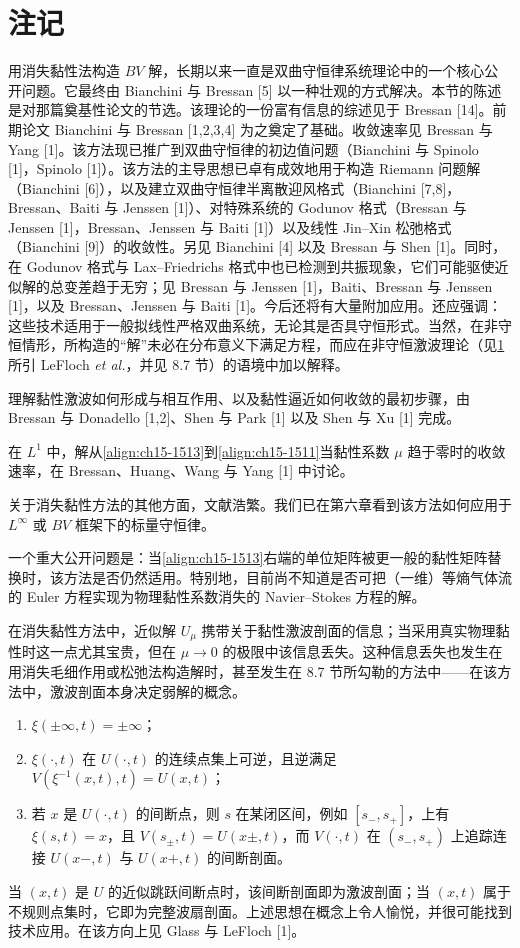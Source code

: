 \documentclass[../../main.tex]{subfiles}
\begin{document}
\section{注记}\label{section:ch15-注记}

用消失黏性法构造 $BV$ 解，长期以来一直是双曲守恒律系统理论中的一个核心公开问题。它最终由 Bianchini 与 Bressan [5] 以一种壮观的方式解决。本节的陈述是对那篇奠基性论文的节选。该理论的一份富有信息的综述见于 Bressan [14]。前期论文 Bianchini 与 Bressan [1,2,3,4] 为之奠定了基础。收敛速率见 Bressan 与 Yang [1]。该方法现已推广到双曲守恒律的初边值问题（Bianchini 与 Spinolo [1]，Spinolo [1]）。该方法的主导思想已卓有成效地用于构造 Riemann 问题解（Bianchini [6]），以及建立双曲守恒律半离散迎风格式（Bianchini [7,8]，Bressan、Baiti 与 Jenssen [1]）、对特殊系统的 Godunov 格式（Bressan 与 Jenssen [1]，Bressan、Jenssen 与 Baiti [1]）以及线性 Jin--Xin 松弛格式（Bianchini [9]）的收敛性。另见 Bianchini [4] 以及 Bressan 与 Shen [1]。同时，在 Godunov 格式与 Lax--Friedrichs 格式中也已检测到共振现象，它们可能驱使近似解的总变差趋于无穷；见 Bressan 与 Jenssen [1]，Baiti、Bressan 与 Jenssen [1]，以及 Bressan、Jenssen 与 Baiti [1]。今后还将有大量附加应用。还应强调：这些技术适用于一般拟线性严格双曲系统，无论其是否具守恒形式。当然，在非守恒情形，所构造的“解”未必在分布意义下满足方程，而应在非守恒激波理论（见\cref{section:ch15-注记}所引 LeFloch \emph{et al.}，并见 8.7 节）的语境中加以解释。

理解黏性激波如何形成与相互作用、以及黏性逼近如何收敛的最初步骤，由 Bressan 与 Donadello [1,2]、Shen 与 Park [1] 以及 Shen 与 Xu [1] 完成。

在 $L^1$ 中，解从\eqref{align:ch15-1513}到\eqref{align:ch15-1511}当黏性系数 $\mu$ 趋于零时的收敛速率，在 Bressan、Huang、Wang 与 Yang [1] 中讨论。

关于消失黏性方法的其他方面，文献浩繁。我们已在第六章看到该方法如何应用于 $L^\infty$ 或 $BV$ 框架下的标量守恒律。

一个重大公开问题是：当\eqref{align:ch15-1513}右端的单位矩阵被更一般的黏性矩阵替换时，该方法是否仍然适用。特别地，目前尚不知道是否可把（一维）等熵气体流的 Euler 方程实现为物理黏性系数消失的 Navier--Stokes 方程的解。

在消失黏性方法中，近似解 $U_\mu$ 携带关于黏性激波剖面的信息；当采用真实物理黏性时这一点尤其宝贵，但在 $\mu\to0$ 的极限中该信息丢失。这种信息丢失也发生在用消失毛细作用或松弛法构造解时，甚至发生在 8.7 节所勾勒的方法中——在该方法中，激波剖面本身决定弱解的概念。
\begin{enumerate}
\item\label{item:ch15-159-a} $\xi(\pm\infty,t)=\pm\infty$；
\item\label{item:ch15-159-b} $\xi(\cdot,t)$ 在 $U(\cdot,t)$ 的连续点集上可逆，且逆满足 $V(\xi^{-1}(x,t),t)=U(x,t)$；
\item\label{item:ch15-159-c} 若 $x$ 是 $U(\cdot,t)$ 的间断点，则 $s$ 在某闭区间，例如 $[s_-,s_+]$，上有 $\xi(s,t)=x$，且 $V(s_\pm,t)=U(x\pm,t)$，而 $V(\cdot,t)$ 在 $(s_-,s_+)$ 上追踪连接 $U(x-,t)$ 与 $U(x+,t)$ 的间断剖面。
\end{enumerate}

当 $(x,t)$ 是 $U$ 的近似跳跃间断点时，该间断剖面即为激波剖面；当 $(x,t)$ 属于不规则点集时，它即为完整波扇剖面。上述思想在概念上令人愉悦，并很可能找到技术应用。在该方向上见 Glass 与 LeFloch [1]。
\end{document}
